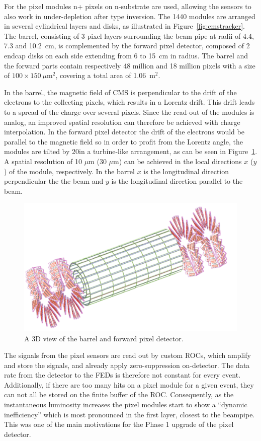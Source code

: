 For the pixel modules n+ pixels on n-substrate are used, allowing the sensors to also work in under-depletion after type inversion. The 1440 modules are arranged in several cylindrical layers and disks, as illustrated in Figure~\ref{fig:cmstracker}. The barrel, consisting of 3 pixel layers surrounding the beam pipe at radii of 4.4, 7.3 and 10.2~cm, is complemented by the forward pixel detector, composed of 2 endcap disks on each side extending from 6 to 15~cm in radius. The barrel and the forward parts contain respectively 48 million and 18 million pixels with a size of $100 \times 150\ \mu\mathrm{m}^2$, covering a total area of 1.06~m$^2$.

In the barrel, the magnetic field of CMS is perpendicular to the drift of the electrons to the collecting pixels, which results in a Lorentz drift. This drift leads to a spread of the charge over several pixels. Since the read-out of the modules is analog, an improved spatial resolution can therefore be achieved with charge interpolation. In the forward pixel detector the drift of the electrons would be parallel to the magnetic field so in order to profit from the Lorentz angle, the modules are tilted by 20\degree in a turbine-like arrangement, as can be seen in Figure~\ref{fig:pix}. A spatial resolution of 10 $\mu$m (30 $\mu$m) can be achieved in the local directions $x$ ($y$) of the module, respectively. In the barrel $x$ is the longitudinal direction perpendicular the the beam and $y$ is the longitudinal direction parallel to the beam. 

\begin{figure}[ht]
  \centering
 \includegraphics[width=.6\textwidth]{pixel}
 \caption{A 3D view of the barrel and forward pixel detector.}
 \label{fig:pix}
\end{figure}

The signals from the pixel sensors are read out by custom \acp{ROC}, which amplify and store the signals, and already apply zero-suppression on-detector. The data rate from the detector to the \acp{FED} is therefore not constant for every event. Additionally, if there are too many hits on a pixel module for a given event, they can not all be stored on the finite buffer of the \ac{ROC}. Consequently, as the instantaneous luminosity increases the pixel modules start to show a ``dynamic inefficiency''  which is most pronounced in the first layer, closest to the beampipe. This was one of the main motivations for the Phase 1 upgrade of the pixel detector.

